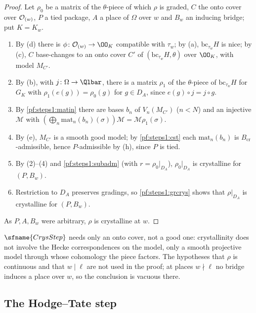 \begin{proof}
Let $\rho_0$ be a matrix of the $\theta$-piece of which $\rho$ is graded, $C$ the onto cover over $\mathcal{O}_{(w)}$, $P$ a tied
package, $A$ a place of $\Omega$ over $w$ and $B_w$ an inducing bridge; put $K=K_w$.
\begin{enumerate}[label=(\arabic*),nosep]
\item By (d) there is $\phi\colon\stepsIOw\to\OO_K$ compatible with $\tau_w$; by (a), $\mathrm{bc}_{\tau_w}H$ is nice; by (c),
  $C$ base-changes to an onto cover $C'$ of $(\mathrm{bc}_{\tau_w}H,\theta)$ over $\OO_K$, with model $M_{C'}$.
\item By (b), with $j\colon\Omega\to\Qlbar$, there is a matrix $\rho_1$ of the $\theta$-piece of $\mathrm{bc}_{\tau_w}H$ for $G_K$
  with $\rho_1(e(g))=\rho_0(g)$ for $g\in D_A$, since $e(g)\circ j=j\circ g$.
\item By \cref{pf:steps1:matin} there are bases $b_n$ of $V_n(M_{C'})$ ($n<N$) and an injective $\mathcal M$ with
  $(\bigoplus_n\mathrm{mat}_n(b_n)(\sigma))\mathcal M=\mathcal M\rho_1(\sigma)$.
\item By (e), $M_{C'}$ is a smooth good model; by \cref{pf:steps1:cst} each $\mathrm{mat}_n(b_n)$ is
  $B_{\mathrm{cr}}$-admissible, hence $P$-admissible by (h), since $P$ is tied.
\item By (2)--(4) and \cref{pf:steps1:subadm} (with $r=\rho_0|_{D_A}$), $\rho_0|_{D_A}$ is crystalline for $(P,B_w)$.
\item Restriction to $D_A$ preserves gradings, so \cref{pf:steps1:grcrys} shows that $\rho|_{D_A}$ is crystalline for $(P,B_w)$.
\end{enumerate}
As $P,A,B_w$ were arbitrary, $\rho$ is crystalline at $w$.
\end{proof}

\begin{remark}
$\sfname{CrysStep}$ needs only an onto cover, not a good one: crystallinity does not involve the Hecke correspondences on the
model, only a smooth projective model through whose cohomology the piece factors. The hypotheses that $\rho$ is continuous and
that $w\mid\ell$ are not used in the proof; at places $w\nmid\ell$ no bridge induces a place over $w$, so the conclusion is
vacuous there.
\end{remark}

\subsection{The Hodge--Tate step}\label{sec:pf:steps1:jump}

